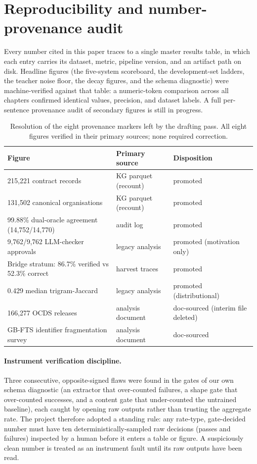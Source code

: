 \section{Reproducibility and number-provenance audit}\label{app:audit}

Every number cited in this paper traces to a single master results table, in which each entry
carries its dataset, metric, pipeline version, and an artifact path on disk. Headline figures
(the five-system scoreboard, the development-set ladders, the teacher noise floor, the decay
figures, and the schema diagnostic) were machine-verified against that table: a numeric-token
comparison across all chapters confirmed identical values, precision, and dataset labels. A full
per-sentence provenance audit of secondary figures is still in progress.

\begin{table}[h]
\centering\small
\caption{Resolution of the eight provenance markers left by the drafting pass. All eight figures
verified in their primary sources; none required correction.}
\label{tab:audit}
\begin{tabular}{lll}
\toprule
Figure & Primary source & Disposition \\
\midrule
215{,}221 contract records & KG parquet (recount) & promoted \\
131{,}502 canonical organisations & KG parquet (recount) & promoted \\
99.88\% dual-oracle agreement (14{,}752/14{,}770) & audit log & promoted \\
9{,}762/9{,}762 LLM-checker approvals & legacy analysis & promoted (motivation only) \\
Bridge stratum: 86.7\% verified vs 52.3\% correct & harvest traces & promoted \\
0.429 median trigram-Jaccard & legacy analysis & promoted (distributional) \\
166{,}277 OCDS releases & analysis document & doc-sourced (interim file deleted) \\
GB-FTS identifier fragmentation survey & analysis document & doc-sourced \\
\bottomrule
\end{tabular}
\end{table}

\paragraph{Instrument verification discipline.} Three consecutive, opposite-signed flaws were
found in the gates of our own schema diagnostic (an extractor that over-counted failures, a
shape gate that over-counted successes, and a content gate that under-counted the untrained
baseline), each caught by opening raw outputs rather than trusting the aggregate rate. The
project therefore adopted a standing rule: any rate-type, gate-decided number must have ten
deterministically-sampled raw decisions (passes and failures) inspected by a human before it
enters a table or figure. A suspiciously clean number is treated as an instrument fault until
its raw outputs have been read.
